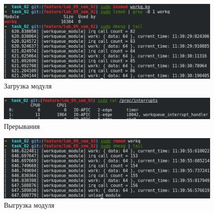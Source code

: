\begin{figure}[H]
    \centering
    \includegraphics[scale=0.7]{img/part_02/insmod.png}
    \caption{Загрузка модуля}
\end{figure}

\begin{figure}[H]
    \centering
    \includegraphics[scale=0.7]{img/part_02/interrupt.png}
    \caption{Прерывания}
\end{figure}

\begin{figure}[H]
    \centering
    \includegraphics[scale=0.7]{img/part_02/rmmod.png}
    \caption{Выгрузка модуля}
\end{figure}
